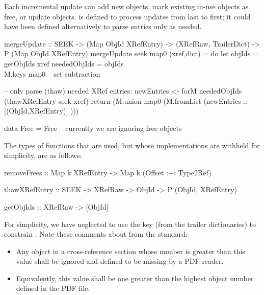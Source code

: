Each incremental update can add new objects, mark existing in-use objects as free, or update objects.
%
 is defined to process updates from last to first;
%
it could have been defined alternatively to parse \xref{} entries only as needed.
%

\begin{code}
mergeUpdate :: SEEK
            ->  (Map ObjId XRefEntry)
            -> (XRefRaw, TrailerDict)
            -> P (Map ObjId XRefEntry)
mergeUpdate seek map0 (xref,dict) =
    do
    let objIds       = getObjIds xref
        neededObjIds = objIds \\ M.keys map0
                       -- set subtraction

    -- only parse (thaw) needed XRef entries:
    newEntries <- forM neededObjIds
                       (thawXRefEntry seek xref)
    return
      (M.union map0 (M.fromList (newEntries :: [(ObjId,XRefEntry)] )))

data Free = Free  -- currently we are ignoring free objects
\end{code}
The types of functions that are used, but whose implementations are withheld for simplicity, are as follows:
\begin{code}
removeFrees :: Map k XRefEntry -> Map k (Offset :+: Type2Ref)

thawXRefEntry :: SEEK -> XRefRaw -> ObjId -> P (ObjId, XRefEntry)

getObjIds :: XRefRaw -> [ObjId]
\end{code}

For simplicity, we have neglected to use the  key (from
the trailer dictionaries) to constrain \objids{}.  Note these comments
about  from the standard:
\begin{itemize}
  \item Any object in a cross-reference section whose number is
    greater than this value shall be ignored and defined to be missing
    by a PDF reader.
  \item Equivalently, this value shall be one greater than the highest object number defined in the PDF file.
\end{itemize}

